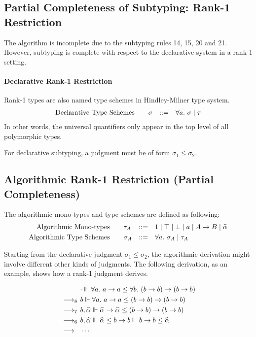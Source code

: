 \subsection{Partial Completeness of Subtyping: Rank-1 Restriction}

The algorithm is incomplete due to the subtyping rules 14, 15, 20 and 21.
However, subtyping is complete with respect to the declarative system in a rank-1 setting.

\paragraph{Declarative Rank-1 Restriction}

Rank-1 types are also named type schemes in Hindley-Milner type system.
$$\begin{aligned}
    \text{Declarative Type Schemes}\qquad&\sigma &::=&\quad \all \sigma \mid \tau\\
\end{aligned}$$
In other words, the universal quantifiers only appear in the top level
of all polymorphic types.

For declarative subtyping, a judgment must be of form $\sigma_1 \le \sigma_2$.

\subsection{Algorithmic Rank-1 Restriction (Partial Completeness)}

The algorithmic mono-types and type schemes are defined as following:
$$\begin{aligned}
    \text{Algorithmic Mono-types}\qquad&\tau_A &::=&\quad
        1 \mid \top \mid \bot \mid a \mid A\to B \mid \al\\
    \text{Algorithmic Type Schemes}\qquad&\sigma_A &::=&\quad \all \sigma_A \mid \tau_A\\
\end{aligned}$$

Starting from the declarative judgment $\sigma_1 \le \sigma_2$,
the algorithmic derivation might involve different other kinds of judgments.
The following derivation, as an example, shows how a rank-1 judgment derives.

$$\begin{aligned}
           & \cdot \Vdash \all a \to a \le \all[b] (b \to b) \to (b \to b)\\
    \rrule{8} & b \Vdash \all a \to a \le (b \to b) \to (b \to b)\\
    \rrule{7} & b, \al \Vdash \al \to \al \le (b \to b) \to (b \to b)\\
    \rrule{6} & b, \al \Vdash \al \le b \to b \Vdash b \to b \le \al\\
    \rrule{} & \cdots
\end{aligned}$$


